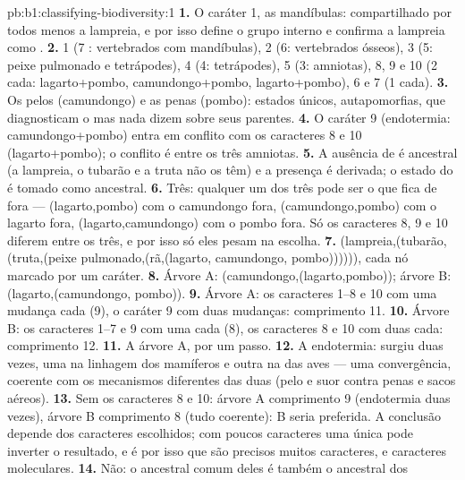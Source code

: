 \begin{solution}{pb:b1:classifying-biodiversity:1}
\textbf{1.} O caráter 1, as mandíbulas: compartilhado por todos menos a
lampreia, e por isso define o grupo interno e confirma a lampreia como
.
\textbf{2.} 1 (7 : vertebrados com mandíbulas), 2 (6: vertebrados
ósseos), 3 (5: peixe pulmonado e tetrápodes), 4 (4: tetrápodes), 5 (3:
amniotas), 8, 9 e 10 (2 cada: lagarto+pombo, camundongo+pombo,
lagarto+pombo), 6 e 7 (1 cada).
\textbf{3.} Os pelos (camundongo) e as penas (pombo): estados únicos,
autapomorfias, que diagnosticam o  mas nada dizem sobre seus
parentes.
\textbf{4.} O caráter 9 (endotermia: camundongo+pombo) entra em
conflito com os caracteres 8 e 10 (lagarto+pombo); o conflito é entre
os três amniotas.
\textbf{5.} A ausência de  é ancestral (a lampreia, o tubarão e
a truta não os têm) e a presença é derivada; o estado do 
é tomado como ancestral.
\textbf{6.} Três: qualquer um dos três pode ser o que fica de fora ---
(lagarto,pombo) com o camundongo fora, (camundongo,pombo) com o
lagarto fora, (lagarto,camundongo) com o pombo fora. Só os caracteres
8, 9 e 10 diferem entre os três, e por isso só eles pesam na escolha.
\textbf{7.} (lampreia,(tubarão,(truta,(peixe pulmonado,(rã,(lagarto,
camundongo, pombo)))))), cada nó marcado por um caráter.
\textbf{8.} Árvore A: (camundongo,(lagarto,pombo)); árvore B:
(lagarto,(camundongo, pombo)).
\textbf{9.} Árvore A: os caracteres 1--8 e 10 com uma mudança cada (9),
o caráter 9 com duas mudanças: comprimento \num{11}.
\textbf{10.} Árvore B: os caracteres 1--7 e 9 com uma cada (8), os
caracteres 8 e 10 com duas cada: comprimento \num{12}.
\textbf{11.} A árvore A, por um passo.
\textbf{12.} A endotermia: surgiu duas vezes, uma na linhagem dos
mamíferos e outra na das aves --- uma convergência, coerente com os
mecanismos diferentes das duas (pelo e suor contra penas e sacos
aéreos).
\textbf{13.} Sem os caracteres 8 e 10: árvore A comprimento 9
(endotermia duas vezes), árvore B comprimento 8 (tudo coerente): B
seria preferida. A conclusão depende dos caracteres escolhidos; com
poucos caracteres uma única  pode inverter o resultado, e é
por isso que são precisos muitos caracteres, e caracteres moleculares.
\textbf{14.} Não: o ancestral comum deles é também o ancestral dos

\end{solution}
